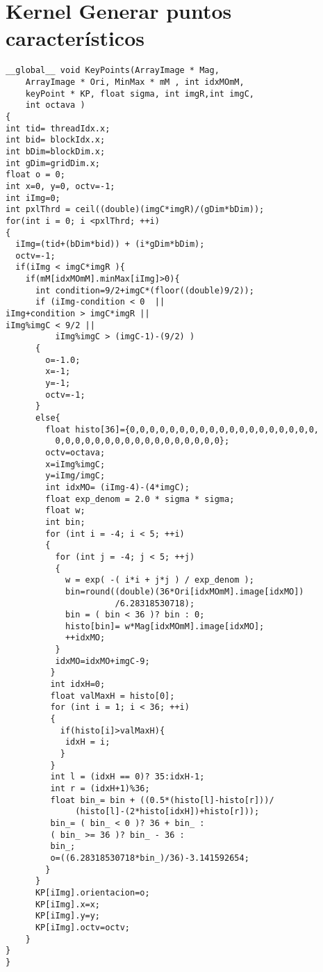 \chapter{Kernel Generar puntos característicos}
\begin{small}

\begin{lstlisting}
__global__ void KeyPoints(ArrayImage * Mag,
	ArrayImage * Ori, MinMax * mM , int idxMOmM,
	keyPoint * KP, float sigma, int imgR,int imgC,
	int octava )
{
int tid= threadIdx.x;
int bid= blockIdx.x;
int bDim=blockDim.x;
int gDim=gridDim.x;
float o = 0;
int x=0, y=0, octv=-1;
int iImg=0;
int pxlThrd = ceil((double)(imgC*imgR)/(gDim*bDim)); 
for(int i = 0; i <pxlThrd; ++i) 
{
  iImg=(tid+(bDim*bid)) + (i*gDim*bDim);  
  octv=-1;
  if(iImg < imgC*imgR ){
    if(mM[idxMOmM].minMax[iImg]>0){
  	  int condition=9/2+imgC*(floor((double)9/2));
  	  if (iImg-condition < 0  ||														iImg+condition > imgC*imgR ||												iImg%imgC < 9/2 ||						  			
  		  iImg%imgC > (imgC-1)-(9/2) )							
  	  {                  
  	    o=-1.0;
  	    x=-1;
  	    y=-1;
  	    octv=-1;
  	  }
  	  else{
  	    float histo[36]={0,0,0,0,0,0,0,0,0,0,0,0,0,0,0,0,0,0,0,
  	  	  0,0,0,0,0,0,0,0,0,0,0,0,0,0,0,0,0};
  	    octv=octava;
  	    x=iImg%imgC;
  	    y=iImg/imgC;
  	    int idxMO= (iImg-4)-(4*imgC);
  	    float exp_denom = 2.0 * sigma * sigma;
  	    float w;
  	    int bin;
  	    for (int i = -4; i < 5; ++i)
  	    {
  	      for (int j = -4; j < 5; ++j)
  		  {
  		    w = exp( -( i*i + j*j ) / exp_denom );
  		    bin=round((double)(36*Ori[idxMOmM].image[idxMO])
  		  	  		  /6.28318530718);
    		bin = ( bin < 36 )? bin : 0;
    		histo[bin]= w*Mag[idxMOmM].image[idxMO];
    		++idxMO;
  		  }
  		  idxMO=idxMO+imgC-9;
  	     }
  	     int idxH=0;
  	     float valMaxH = histo[0];
  	     for (int i = 1; i < 36; ++i)
  	     {
  	       if(histo[i]>valMaxH){
  	        idxH = i;
  	       }
  	     }
  	     int l = (idxH == 0)? 35:idxH-1;
  	     int r = (idxH+1)%36;
  	     float bin_= bin + ((0.5*(histo[l]-histo[r]))/
  	   		  (histo[l]-(2*histo[idxH])+histo[r]));
  	     bin_= ( bin_ < 0 )? 36 + bin_ :
  	     ( bin_ >= 36 )? bin_ - 36 :
  	     bin_;
  	     o=((6.28318530718*bin_)/36)-3.141592654;
        }
      }
      KP[iImg].orientacion=o;
      KP[iImg].x=x;
      KP[iImg].y=y;
      KP[iImg].octv=octv;
	}
}
}
\end{lstlisting}

\end{small}
\pagebreak

